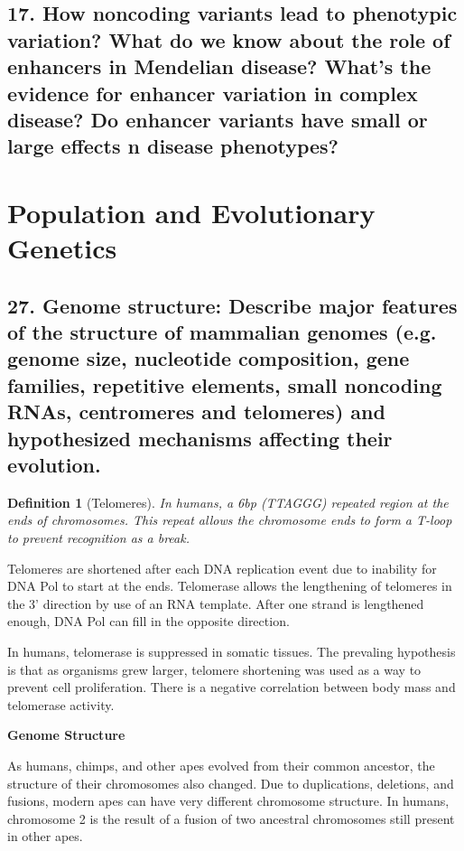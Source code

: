\documentclass{tufte-handout}
\theoremstyle{noparens}
\newtheorem*{define}{Definition}
\begin{document}
\newpage 
\subsection{17. How noncoding variants lead to phenotypic variation? What do we know about the role of enhancers in Mendelian disease? What's the evidence for enhancer variation in complex disease? Do enhancer variants have small or large effects n disease phenotypes?}

\newpage
\section{Population and Evolutionary Genetics}\label{sec:popgen}

\subsection{27.
Genome structure: Describe major features of the structure of mammalian genomes (e.g. 
genome size, nucleotide composition, gene families, repetitive elements, small noncoding RNAs, centromeres and telomeres) and hypothesized mechanisms affecting their evolution.}

\begin{define}[Telomeres]
In humans, a 6bp (TTAGGG) repeated region at the ends of chromosomes. This repeat allows the chromosome ends to form a T-loop to prevent recognition as a break.
\end{define}

Telomeres are shortened after each DNA replication event due to inability for DNA Pol to start at the ends. Telomerase allows the lengthening of telomeres in the 3' direction by use of an RNA template. After one strand is lengthened enough, DNA Pol can fill in the opposite direction.

In humans, telomerase is suppressed in somatic tissues. The prevaling hypothesis is that as organisms grew larger, telomere shortening was used as a way to prevent cell proliferation. There is a negative correlation between body mass and telomerase activity.

\textbf{Genome Structure}

As humans, chimps, and other apes evolved from their common ancestor, the structure of their chromosomes also changed. Due to duplications, deletions, and fusions, modern apes can have very different chromosome structure. In humans, chromosome 2 is the result of a fusion of two ancestral chromosomes still present in other apes.
\end{document}
